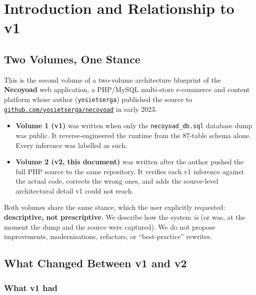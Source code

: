 \documentclass[11pt,a4paper]{article}
\begin{document}
\newpage
\tableofcontents
\newpage

\section{Introduction and Relationship to v1}\label{sec:intro}

\subsection{Two Volumes, One Stance}

This is the second volume of a two-volume architecture blueprint of the
\textbf{Necoyoad} web application, a PHP/MySQL multi-store e-commerce
and content platform whose author (\texttt{yosietserga}) published the
source to \href{https://github.com/yosietserga/necoyoad}{\texttt{github.com/yosietserga/necoyoad}}
in early 2023.

\begin{itemize}[leftmargin=1.6em,itemsep=2pt]
  \item \textbf{Volume 1 (v1)} was written when only the
        \texttt{necoyoad\_db.sql} database dump was public. It
        reverse-engineered the runtime from the 87-table schema alone.
        Every inference was labelled as such.
  \item \textbf{Volume 2 (v2, this document)} was written after the
        author pushed the full PHP source to the same repository.
        It verifies each v1 inference against the actual code,
        corrects the wrong ones, and adds the source-level
        architectural detail v1 could not reach.
\end{itemize}

Both volumes share the same stance, which the user explicitly requested:
\textbf{descriptive, not prescriptive}. We describe how the system
\emph{is} (or was, at the moment the dump and the source were
captured). We do not propose improvements, modernisations, refactors,
or ``best-practice'' rewrites.

\subsection{What Changed Between v1 and v2}

\subsubsection{What v1 had}
\end{document}
